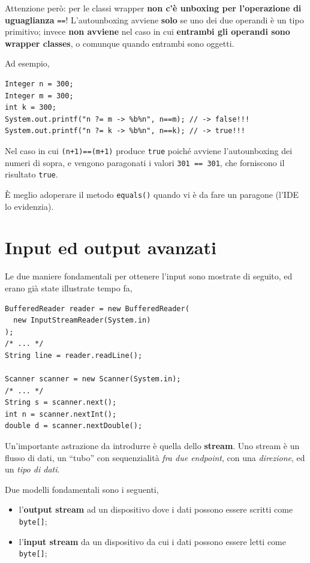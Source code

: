 \documentclass[\fontsizeclass,twocolumn]{\classname}
\theoremstyle{definition}
\theoremstyle{definition}
\begin{document}
Attenzione però: per le classi wrapper \textbf{non c'è unboxing per
l'operazione di uguaglianza} \texttt{==}! L'autounboxing avviene \textbf{solo}
se uno dei due operandi è un tipo primitivo; invece \textbf{non avviene} nel
caso in cui \textbf{entrambi gli operandi sono wrapper classes}, o comunque
quando entrambi sono oggetti.

Ad esempio,

\begin{lstlisting}
Integer n = 300;
Integer m = 300;
int k = 300;
System.out.printf("n ?= m -> %b%n", n==m); // -> false!!!
System.out.printf("n ?= k -> %b%n", n==k); // -> true!!!
\end{lstlisting}

Nel caso in cui \texttt{(n+1)==(m+1)} produce \texttt{true} poiché avviene
l'autounboxing dei numeri di sopra, e vengono paragonati i valori \texttt{301
== 301}, che forniscono il risultato \texttt{true}.

È meglio adoperare il metodo \texttt{equals()} quando vi è da fare un paragone
(l'IDE lo evidenzia).

\chapter{Input ed output avanzati}

Le due maniere fondamentali per ottenere l'input sono mostrate di seguito, ed
erano già state illustrate tempo fa,

\begin{lstlisting}
BufferedReader reader = new BufferedReader(
  new InputStreamReader(System.in)
);
/* ... */
String line = reader.readLine();

Scanner scanner = new Scanner(System.in);
/* ... */
String s = scanner.next();
int n = scanner.nextInt();
double d = scanner.nextDouble();
\end{lstlisting}

Un'importante astrazione da introdurre è quella dello \textbf{stream}. Uno
stream è un flusso di dati, un ``tubo'' con sequenzialità \emph{fra due
endpoint}, con una \emph{direzione}, ed un \emph{tipo di dati}.

Due modelli fondamentali sono i seguenti,

\begin{itemize}
    \item l'\textbf{output stream} ad un dispositivo dove i dati possono essere
        scritti come \texttt{byte[]};
    \item l'\textbf{input stream} da un dispositivo da cui i dati possono
        essere letti come \texttt{byte[]};
\end{itemize}
\end{document}
